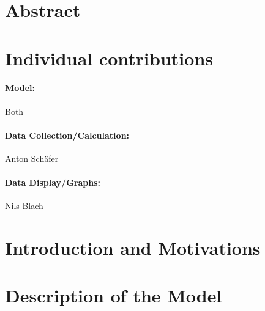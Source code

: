 \documentclass[11pt]{article}
\begin{document}
\section{Abstract}

\section{Individual contributions}
\paragraph{Model:} Both
\paragraph{Data Collection/Calculation:} Anton Sch{\"a}fer
\paragraph{Data Display/Graphs:} Nils Blach

\section{Introduction and Motivations}

\section{Description of the Model}
\end{document}
